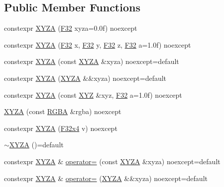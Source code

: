 \subsection*{Public Member Functions}
\begin{DoxyCompactItemize}
\item 
constexpr \hyperlink{structmage_1_1_x_y_z_a_ab954075ab032465c9199870646a2718b}{X\+Y\+ZA} (\hyperlink{namespacemage_aa97e833b45f06d60a0a9c4fc22ae02c0}{F32} xyza=0.\+0f) noexcept
\item 
constexpr \hyperlink{structmage_1_1_x_y_z_a_abe082fe71a6b7f7a855b65f5491e24d6}{X\+Y\+ZA} (\hyperlink{namespacemage_aa97e833b45f06d60a0a9c4fc22ae02c0}{F32} x, \hyperlink{namespacemage_aa97e833b45f06d60a0a9c4fc22ae02c0}{F32} y, \hyperlink{namespacemage_aa97e833b45f06d60a0a9c4fc22ae02c0}{F32} z, \hyperlink{namespacemage_aa97e833b45f06d60a0a9c4fc22ae02c0}{F32} a=1.\+0f) noexcept
\item 
constexpr \hyperlink{structmage_1_1_x_y_z_a_a9fdc619e5081ac4ffd6f880ebe49311e}{X\+Y\+ZA} (const \hyperlink{structmage_1_1_x_y_z_a}{X\+Y\+ZA} \&xyza) noexcept=default
\item 
constexpr \hyperlink{structmage_1_1_x_y_z_a_ad5a2327287cd23d1e5bb1bb1b850affd}{X\+Y\+ZA} (\hyperlink{structmage_1_1_x_y_z_a}{X\+Y\+ZA} \&\&xyza) noexcept=default
\item 
constexpr \hyperlink{structmage_1_1_x_y_z_a_a0694b46dd33304f23ca21c0cde51783d}{X\+Y\+ZA} (const \hyperlink{structmage_1_1_x_y_z}{X\+YZ} \&xyz, \hyperlink{namespacemage_aa97e833b45f06d60a0a9c4fc22ae02c0}{F32} a=1.\+0f) noexcept
\item 
\hyperlink{structmage_1_1_x_y_z_a_a8571290c4ba9eaf9d33da17f30b8ac0f}{X\+Y\+ZA} (const \hyperlink{structmage_1_1_r_g_b_a}{R\+G\+BA} \&rgba) noexcept
\item 
constexpr \hyperlink{structmage_1_1_x_y_z_a_a6065beb34f7d2a3ac0a0838a96542aa6}{X\+Y\+ZA} (\hyperlink{namespacemage_a9b8168505574a087f7391e56522fa584}{F32x4} v) noexcept
\item 
\hyperlink{structmage_1_1_x_y_z_a_a2f706527b01ff7e86099b76180ebd25f}{$\sim$\+X\+Y\+ZA} ()=default
\item 
constexpr \hyperlink{structmage_1_1_x_y_z_a}{X\+Y\+ZA} \& \hyperlink{structmage_1_1_x_y_z_a_a04a66bdc8e61c6b415e1b509f466bf50}{operator=} (const \hyperlink{structmage_1_1_x_y_z_a}{X\+Y\+ZA} \&xyza) noexcept=default
\item 
constexpr \hyperlink{structmage_1_1_x_y_z_a}{X\+Y\+ZA} \& \hyperlink{structmage_1_1_x_y_z_a_a15556bcc4521264fc3edfc1b4f1a595a}{operator=} (\hyperlink{structmage_1_1_x_y_z_a}{X\+Y\+ZA} \&\&xyza) noexcept=default
\end{DoxyCompactItemize}


